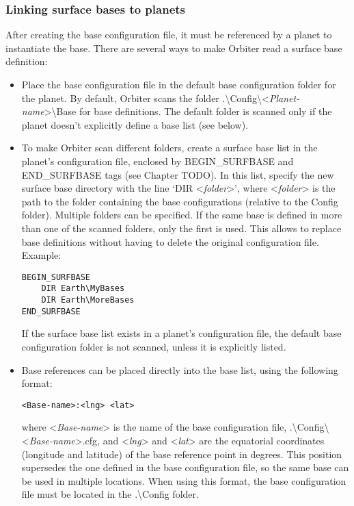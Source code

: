\documentclass[Orbiter Developer Manual.tex]{subfiles}
\begin{document}
\subsubsection*{Linking surface bases to planets}
After creating the base configuration file, it must be referenced by a planet to instantiate the base. There are several ways to make Orbiter read a surface base definition:

\begin{itemize}
\item Place the base configuration file in the default base configuration folder for the planet. By default, Orbiter scans the folder .\textbackslash Config\textbackslash <\textit{Planet-name}>\textbackslash Base for base definitions. The default folder is scanned only if the planet doesn’t explicitly define a base list (see below).
\item To make Orbiter scan different folders, create a surface base list in the planet’s configuration file, enclosed by BEGIN\_SURFBASE and END\_SURFBASE tags (see Chapter TODO). In this list, specify the new surface base directory with the line ‘DIR <\textit{folder}>’, where <\textit{folder}> is the path to the folder containing the base configurations (relative to the Config folder). Multiple folders can be specified. If the same base is defined in more than one of the scanned folders, only the first is used. This allows to replace base definitions without having to delete the original configuration file. Example:

\begin{lstlisting}[language=OSFS]
BEGIN_SURFBASE
	DIR Earth\MyBases
	DIR Earth\MoreBases
END_SURFBASE
\end{lstlisting}

\noindent
If the surface base list exists in a planet’s configuration file, the default base configuration folder is not scanned, unless it is explicitly listed.
\item Base references can be placed directly into the base list, using the following format:\\

\begin{lstlisting}[language=OSFS]
<Base-name>:<lng> <lat>
\end{lstlisting}

\noindent
where <\textit{Base-name}> is the name of the base configuration file, .\textbackslash Config\textbackslash <\textit{Base-name}>.cfg, and <\textit{lng}> and <\textit{lat}> are the equatorial coordinates (longitude and latitude) of the base reference point in degrees. This position supersedes the one defined in the base configuration file, so the same base can be used in multiple locations. When using this format, the base configuration file must be located in the .\textbackslash Config folder.
\end{itemize}
\end{document}
